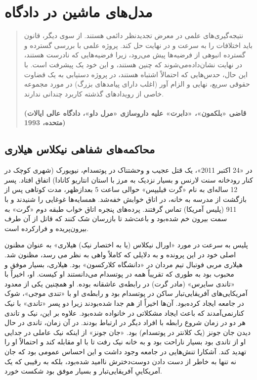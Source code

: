 

\chapter{مدل‌های ماشین در دادگاه}
\label{ch:مدل‌های ماشین در دادگاه}

\begin{quote}
    نتیجه‌گیری‌های علمی در معرض تجدید‌نظر دائمی هستند.
    از سوی دیگر، قانون باید اختلافات را به سرعت و در نهایت حل کند.
    پروژه علمی با بررسی گسترده و گسترده انبوهی از فرضیه‌ها پیش می‌رود، زیرا فرضیه‌هایی که نادرست هستند، در نهایت نشان‌داده‌می‌شوند که چنین هستند، و این خود یک پیشرفت است.
    با این حال، حدس‌هایی که احتمالاً اشتباه هستند، در پروژه دستیابی به یک قضاوت حقوقی سریع، نهایی و الزام آور (اغلب دارای پیامدهای بزرگ) در مورد مجموعه خاصی از رویدادهای گذشته کاربرد چندانی ندارند.
    \\\\
    \textbf{(قاضی «بلکمون»، «دابرت» علیه داروسازی «مرل داو»، دادگاه عالی ایالات متحده، 1993)}
\end{quote}


\newpage


{
\section*{محاکمه‌های شفاهی نیکلاس هیلاری}
\label{sec:محاکمه‌های شفاهی نیکلاس هیلاری}
در «24 اکتبر 2011»، یک قتل عجیب و وحشتناک در پوتسدام، نیویورک (شهری کوچک در کنار رودخانه سنت لارنس و بسیار نزدیک به مرز با استان انتاریو کانادا) اتفاق افتاد. پسر 12 ساله‌ای به نام «گرت فیلیپس» حوالی ساعت 5 بعدازظهر، مدت کوتاهی پس از بازگشت از مدرسه به خانه، در اتاق خوابش خفه‌شد. همسایه‌ها غوغایی را شنیدند و با 911 (پلیس آمریکا) تماس گرفتند. پرده‌های پنجره اتاق خواب طبقه دوم «گرت» به سمت بیرون خم شده‌بود و باعث‌شد تا بازرسان شک کنند که قاتل از آن طرف بیرون‌پریده و فرار‌کرده است.
}

پلیس به سرعت در مورد «اورال نیکلاس (یا به اختصار نیک) هیلاری» به عنوان مظنون اصلی خود در این پرونده و به دلایلی که کاملاً واهی به نظر می رسد، مظنون شد.
هیلاری مربی فوتبال تیم مردان در «دانشگاه کلارکسون» بود.
هیلاری، بسیار موفق و محبوب بود به طوری که تقریباً همه در پوتسدام می‌دانستند او کیست.
او، اخیراً با «تاندی سایرس» (مادر گرت) در رابطه‌ی عاشقانه بوده.
او همچنین یکی از معدود آمریکایی‌های آفریقایی‌تبار ساکن در پوتسدام بود و رابطه‌ی او با «تندی موجی»، شوک در جامعه ایجاد کرده‌بود.
آن‌ها اخیراً از هم جدا شده‌بودند زیرا دو پسر «تاندی» با نیک کنار‌نمی‌آمدند که باعث ایجاد مشکلاتی در خانواده شده‌بود.
علاوه بر این، نیک و تاندی هر دو در زمان شروع رابطه با افراد دیگر در ارتباط بودند.
در آن زمان، تاندی در حال دیدن جان جونز (یک کلانتر در پوتسدام) بود.
«جان جونز» از اینکه نیک عاملی در جدایی او از تاندی بود بسیار ناراحت بود و به خانه نیک رفت تا با او مقابله کند و احتمالاً او را تهدید کند.
آشکارا تنش‌هایی در جامعه وجود داشت و این احساس عمومی بود که جان نه تنها به خاطر از دست دادن دوست‌دخترش ناامید شده‌بود، بلکه به رقیبی که یک آمریکاییِ آفریقایی‌تبار و بسیار موفق بود شکست خورد.

